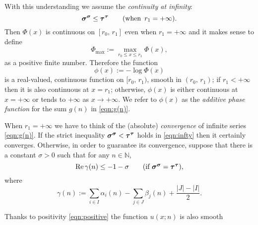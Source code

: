 \documentclass[a4paper,12pt]{article}
\theoremstyle{plain}
\def\rRe{\mathrm{Re}}
\def\N{\mathbb{N}}
\def\bsigma{\mbox{\boldmath $\sigma$}}
\def\sbsigma{\mbox{\boldmath ${\scriptstyle \sigma}$}}
\def\btau{\mbox{\boldmath $\tau$}}
\def\sbtau{\mbox{\boldmath ${\scriptstyle \tau}$}}
\def\Phim{\Phi_{\scriptstyle \mathrm{max}}}
\begin{document}
With this understanding we assume the {\sl continuity at infinity}:    
\begin{equation} \label{eqn:infty}
\bsigma^{\sbsigma} \le \btau^{\sbtau} \qquad (\mbox{when} \,\,\, r_1 = + \infty).   
\end{equation}
Then $\Phi(x)$ is continuous on $[r_0, \, r_1]$ even when $r_1 = + \infty$ and 
it makes sense to define 
\[
\Phim := \max_{r_0 \le x \le r_1} \Phi(x),  
\]
as a positive finite number. 
Therefore the function    
\begin{equation} \label{eqn:phi}
\phi(x) := - \log \Phi(x)  
\end{equation}
is a real-valued, continuous function on $[r_0, \, r_1)$, smooth in $(r_0, \, r_1)$; 
if $r_1 < + \infty$ then it is also continuous at $x = r_1$; otherwise, $\phi(x)$ 
is either continuous at $x = + \infty$ or tends to $+ \infty$ as $x \to + \infty$.   
We refer to $\phi(x)$ as the {\sl additive phase function} for the sum $g(n)$ in 
\eqref{eqn:g(n)}.  
\par
When $r_1 = + \infty$ we have to think of the (absolute)  
{\sl convergence} of infinite series \eqref{eqn:g(n)}.  
If the strict inequality $\bsigma^{\sbsigma} < \btau^{\sbtau}$ holds in 
\eqref{eqn:infty} then it certainly converges. 
Otherwise, in order to guarantee its convergence, suppose that 
there is a constant $\sigma > 0$ such that for any $n \in \N$,    
\begin{equation} \label{eqn:conv}
\rRe \, \gamma(n) \le -1-\sigma  \qquad 
(\mbox{if $\bsigma^{\sbsigma} = \btau^{\sbtau}$}), 
\end{equation}
where
\begin{equation} \label{eqn:ga(n)} 
\gamma(n) := \sum_{i \in I} \alpha_i(n) - \sum_{j \in J} 
\beta_j(n) + \frac{|J|-|I|}{2}.    
\end{equation}
\par
Thanks to positivity \eqref{eqn:positive} the function $u(x; n)$ is also smooth 
\end{document}

